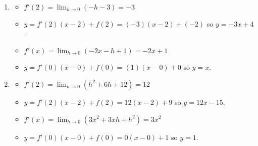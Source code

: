 \documentclass{ximera}
\begin{document}
\begin{enumerate}
\setcounter{enumi}{\value{HW}}

\item \begin{itemize}  \item $f'(2) = \lim_{h \rightarrow 0} (-h-3) = -3$

\smallskip

\item  $y = f'(2)(x-2) + f(2) = (-3)(x-2)+(-2)$ so $y  = -3x+4$.

\smallskip

\item   $f'(x) =  \lim_{h \rightarrow 0} (-2x-h+1) = -2x+1$ 

\smallskip

\item  $y = f'(0)(x-0) + f(0) = (1)(x-0) + 0$ so $y = x$.

\smallskip

\end{itemize}

\item \begin{itemize}

\item $f'(2) = \lim_{h \rightarrow 0} \left( h^2+6h+12 \right) = 12$

\smallskip

\item  $y = f'(2)(x-2) + f(2) = 12(x-2)+ 9$ so $y = 12x - 15$.

\smallskip

\item  $f'(x) = \lim_{h \rightarrow 0} \left(3x^{2} + 3xh + h^{2} \right) = 3x^{2}$ 

\smallskip

\item $y = f'(0)(x-0)+f(0) = 0(x-0)+1$ so $y = 1$.

\smallskip

\end{itemize} 

\setcounter{HW}{\value{enumi}}
\end{enumerate}
\end{document}
